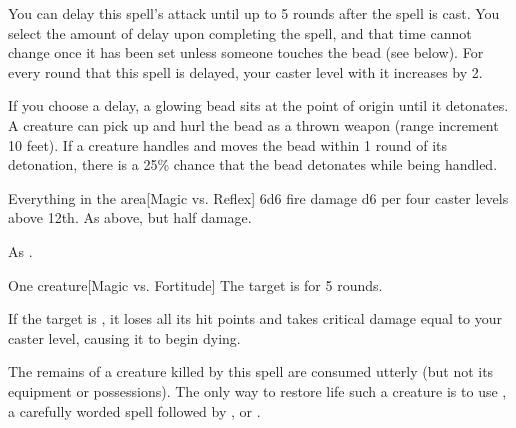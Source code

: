 \begin{spellheader}
\end{spellheader}
\begin{spelleffects}
    \spellline
    \spelleffect You can delay this spell's attack until up to 5 rounds after the spell is cast. You select the amount of delay upon completing the spell, and that time cannot change once it has been set unless someone touches the bead (see below). For every round that this spell is delayed, your caster level with it increases by 2.

    If you choose a delay, a glowing bead sits at the point of origin until it detonates. A creature can pick up and hurl the bead as a thrown weapon (range increment 10 feet). If a creature handles and moves the bead within 1 round of its detonation, there is a 25\% chance that the bead detonates while being handled.
    \begin{spelltargets}{Everything in the area}[Magic vs. Reflex]
        \spellsuccess 6d6 fire damage \add d6 per four caster levels above 12th.
        \spellfailure As above, but half damage.
    \end{spelltargets}

\end{spelleffects}
\begin{spellfooter}
    \spellnotes As .
\end{spellfooter}

\begin{spellheader}
    \spellrng{\rngclose}
\end{spellheader}
\begin{spelleffects}
    \begin{spelltarget}{One creature}[Magic vs. Fortitude]
        \spellsuccess The target is \staggered for 5 rounds.

        If the target is \bloodied, it loses all its hit points and takes critical damage equal to your caster level, causing it to begin dying.
    \end{spelltarget}
\end{spelleffects}
\begin{spellfooter}
    \spellnotes The remains of a creature killed by this spell are consumed utterly (but not its equipment or possessions). The only way to restore life such a creature is to use , a carefully worded  spell followed by , or .
\end{spellfooter}

